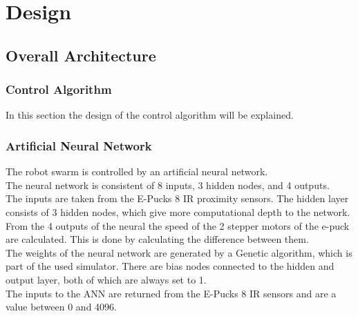 \chapter{Design}



\section{Overall Architecture}
\subsection{Control Algorithm}
In this section the design of the control algorithm will be explained.

\subsection{Artificial Neural Network}
The robot swarm is controlled by an artificial neural network. \\
The neural network is consistent of 8 inputs, 3 hidden nodes, and 4 outputs. \\
The inputs are taken from the E-Pucks 8 IR proximity sensors. The hidden layer consists of 3 hidden nodes, which give more computational depth to the network. \\
From the 4 outputs of the neural the speed of the 2 stepper motors of the e-puck are calculated. This is done by calculating the difference between them. \\
The weights of the neural network are generated by a Genetic algorithm, which is part of the used simulator. 
There are bias nodes connected to the hidden and output layer, both of which are always set to 1. \\

The inputs to the ANN are returned from the E-Pucks 8 IR sensors and are a value between 0 and 4096.\\

